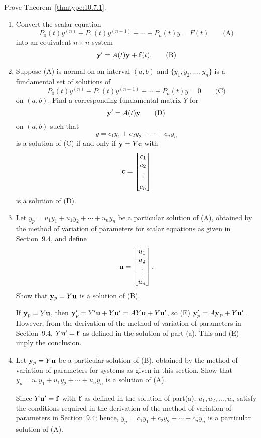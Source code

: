 \documentclass{ximera}
\begin{document}
 \begin{problem}\label{exer:10.7.21}  Prove Theorem~\ref{thmtype:10.7.1}.
 \end{problem}

 \begin{problem}\label{exer:10.7.22}
\begin{enumerate}
\item %
Convert the scalar equation
$$
P_0(t)y^{(n)}+P_1(t)y^{(n-1)}+\cdots+P_n(t)y=F(t)
\quad\quad\text{(A)}
$$
into an equivalent $n\times n$ system
$$
{\bf y}'=A(t){\bf y}+{\bf f}(t).
\quad\quad\text{(B)}
$$
\item %
Suppose  (A) is normal on an interval $(a,b)$ and
$\{y_1,y_2,\dots,y_n\}$ is a fundamental set of solutions of
$$
P_0(t)y^{(n)}+P_1(t)y^{(n-1)}+\cdots+P_n(t)y=0
\quad\quad\text{(C)}
$$
on $(a,b)$. Find a corresponding fundamental matrix $Y$ for
$$
{\bf y}'=A(t){\bf y}
\quad\quad\text{(D)}
$$
on $(a,b)$ such that
$$
y=c_1y_1+c_2y_2+\cdots+c_ny_n
$$
is a solution of  (C) if and only if
${\bf y}=Y{\bf c}$ with
$$
{\bf c}=\begin{bmatrix}c_1\\c_2\\\vdots\\c_n\end{bmatrix}
$$
is a solution of  (D).
\item %
Let $y_p=u_1y_1+u_1y_2+\cdots+u_ny_n$ be a particular solution of
 (A), obtained by the method of variation of parameters for scalar
equations as given in Section~9.4, and define
$$
{\bf u}=\begin{bmatrix}u_1\\u_2\\\vdots\\u_n\end{bmatrix}.
$$
Show that ${\bf y}_p=Y{\bf u}$ is a  solution of  (B).

\begin{solution}
    If ${\bf y}_p=Y{\bf u}$, then ${\bf y}_p'=Y'{\bf u}+Y{\bf u}'=AY{\bf
u}+Y{\bf u}'$, so (E) ${\bf y}_p'=A{\bf y_p}+Y{\bf u}'$. However, from
the derivation of the method of variation of parameters in
Section~9.4, $Y{\bf u}'={\bf f}$ as defined in the solution
of part (a). This and (E) imply the conclusion.
\end{solution}

\item %
Let  ${\bf y}_p=Y{\bf u}$ be  a particular solution of  (B),
obtained by the method of variation of parameters for systems as given in
this section. Show that
 $y_p=u_1y_1+u_1y_2+\cdots+u_ny_n$ is a solution of
 (A).

 \begin{solution}
     Since $Y{\bf u}'={\bf f}$ with ${\bf f}$ as defined in the
solution of part(a), $u_1,u_2,\dots,u_n$ satisfy
the conditions required in the derivation of the method of
variation of parameters in Section~9.4; hence,
$y_p=c_1y_1+c_2y_2+\cdots+c_ny_n$ is a particular solution of (A).
 \end{solution}
\end{enumerate}
\end{problem}
\end{document}
